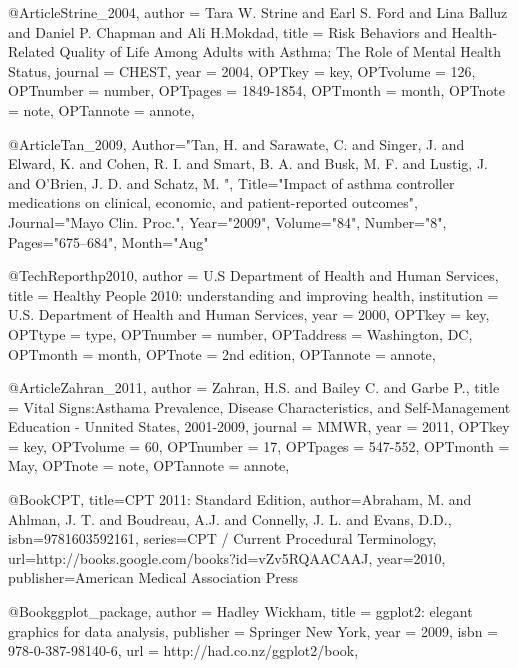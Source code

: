 {{{@Article{Strine_2004,
author = {Tara W. Strine and Earl S. Ford and Lina Balluz and Daniel P. Chapman and Ali H.Mokdad},
title = {Risk Behaviors and Health-Related Quality of Life Among Adults with Asthma: The Role of Mental Health Status},
journal = {CHEST},
year = {2004},
OPTkey = {key},
OPTvolume = {126},
OPTnumber = {number},
OPTpages = {1849-1854},
OPTmonth = {month},
OPTnote = {note},
OPTannote = {annote},
}


@Article{Tan_2009,
   Author="Tan, H.  and Sarawate, C.  and Singer, J.  and Elward, K.  and Cohen, R. I.  and Smart, B. A.  and Busk, M. F.  and Lustig, J.  and O'Brien, J. D.  and Schatz, M. ",
   Title="{{I}mpact of asthma controller medications on clinical, economic, and patient-reported outcomes}",
   Journal="Mayo Clin. Proc.",
   Year="2009",
   Volume="84",
   Number="8",
   Pages="675--684",
   Month="Aug"
}

@TechReport{hp2010,
author = {{U.S Department of Health and Human Services}},
title = {Healthy People 2010: understanding and improving health},
institution = {U.S. Department of Health and Human Services},
year = {2000},
OPTkey = {key},
OPTtype = {type},
OPTnumber = {number},
OPTaddress = {Washington, DC},
OPTmonth = {month},
OPTnote = {2nd edition},
OPTannote = {annote},
}







@Article{Zahran_2011,
author = {Zahran, H.S. and Bailey C. and Garbe P.},
title = {Vital Signs:Asthama Prevalence, Disease Characteristics, and Self-Management Education - Unnited States, 2001-2009},
journal = {MMWR},
year = {2011},
OPTkey = {key},
OPTvolume = {60},
OPTnumber = {17},
OPTpages = {547-552},
OPTmonth = {May},
OPTnote = {note},
OPTannote = {annote},
}





@Book{CPT,
  title={CPT 2011: Standard Edition},
  author={Abraham, M. and Ahlman, J. T. and Boudreau, A.J. and Connelly, J. L. and Evans, D.D.},
  isbn={9781603592161},
  series={CPT / Current Procedural Terminology},
  url={http://books.google.com/books?id=vZv5RQAACAAJ},
  year={2010},
  publisher={American Medical Association Press}
}


  @Book{ggplot_package,
    author = {Hadley Wickham},
    title = {ggplot2: elegant graphics for data analysis},
    publisher = {Springer New York},
    year = {2009},
    isbn = {978-0-387-98140-6},
    url = {http://had.co.nz/ggplot2/book},
  }
 

}}}
